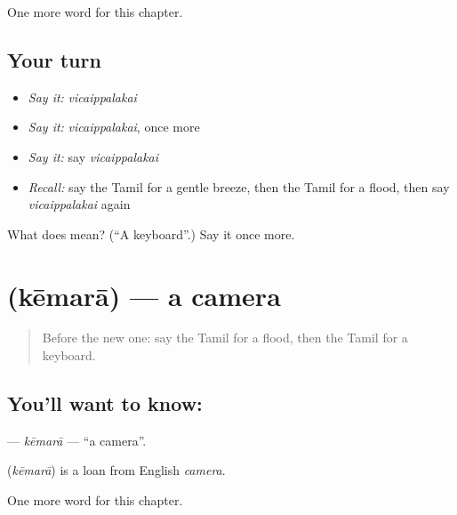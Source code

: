 \begin{grammarlens}[title={What you've built}]
One more word for this chapter.
\end{grammarlens}

\subsection*{Your turn}
\begin{itemize}
\raggedright
  \item \emph{Say it:} \emph{vicaippalakai}
  \item \emph{Say it:} \emph{vicaippalakai}, once more
  \item \emph{Say it:} say \emph{vicaippalakai}
  \item \emph{Recall:} say the Tamil for a gentle breeze, then the Tamil for a flood, then say \emph{vicaippalakai} again
\end{itemize}

\begin{tcolorbox}[breakable,colback=teal!4,colframe=teal!35!black,title={Before you move on}]
What does  mean? (\textquotedblleft{}A keyboard\textquotedblright{}.) Say it once more.
\end{tcolorbox}
\section[\texorpdfstring{\ta{கேமரா} (kēmarā)}{கேமரா (kēmarā)}]{ (kēmarā) — a camera}

\label{lesson:TA-C220-kemara}



\begin{quote}
Before the new one: say the Tamil for a flood, then the Tamil for a keyboard.
\end{quote}

\subsection*{You'll want to know: }
\textbf{} — \emph{kēmarā} — \textquotedblleft{}a camera\textquotedblright{}.

\begin{cousinweb}
\textbf{} (\emph{kēmarā}) is a loan from English \emph{camera}.
\end{cousinweb}

\begin{grammarlens}[title={What you've built}]
One more word for this chapter.
\end{grammarlens}

